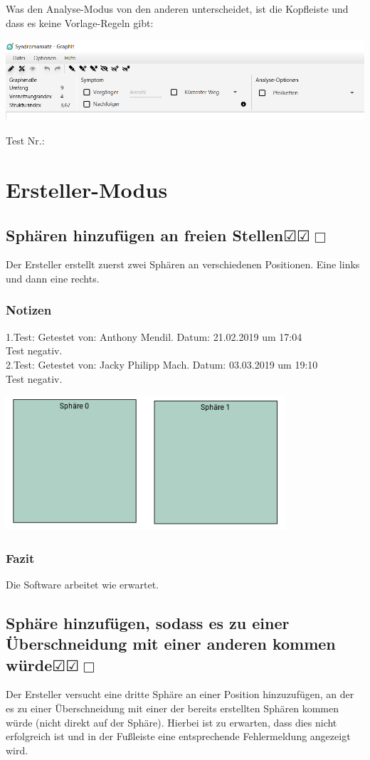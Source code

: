 \documentclass[enabledeprecatedfontcommands]{scrartcl}
\newcommand{\subsectiont}[2]{\subsection[#1]{#1{\normalsize\normalfont #2}}}
\newcommand{\leer}{$\Box$}
\newcommand{\ok}{$\CheckedBox$}
\begin{document}
Was den Analyse-Modus von den anderen unterscheidet, ist die Kopfleiste und dass es keine Vorlage-Regeln gibt:
\begin{center}
	\includegraphics[height=3cm]{analyseModus.png}
\end{center}
\hfill Test Nr.: \setlength{\fboxsep}{1pt}
\newpage
\section{Ersteller-Modus}

\subsectiont{Sphären hinzufügen an freien Stellen}{\dotfill\ok\ok\leer}
Der Ersteller erstellt zuerst zwei Sphären an verschiedenen Positionen. Eine links und dann eine rechts.  
\subsubsection{Notizen}
1.Test: Getestet von: Anthony Mendil. Datum: 21.02.2019 um 17:04 \\
Test negativ. \\
2.Test: Getestet von: Jacky Philipp Mach. Datum: 03.03.2019 um 19:10 \\
Test negativ.
\begin{center}
\includegraphics[height=5cm]{1_1.PNG}
\end{center}
\subsubsection{Fazit}
Die Software arbeitet wie erwartet.

\subsectiont{Sphäre hinzufügen, sodass es zu einer Überschneidung mit einer anderen kommen würde}{\dotfill\ok\ok\leer}
Der Ersteller versucht eine dritte Sphäre an einer Position hinzuzufügen, an der es zu einer Überschneidung mit einer der bereits erstellten Sphären kommen würde (nicht direkt auf der Sphäre). Hierbei ist zu erwarten, dass dies nicht erfolgreich ist und in der Fußleiste eine entsprechende Fehlermeldung angezeigt wird. 
\end{document}
